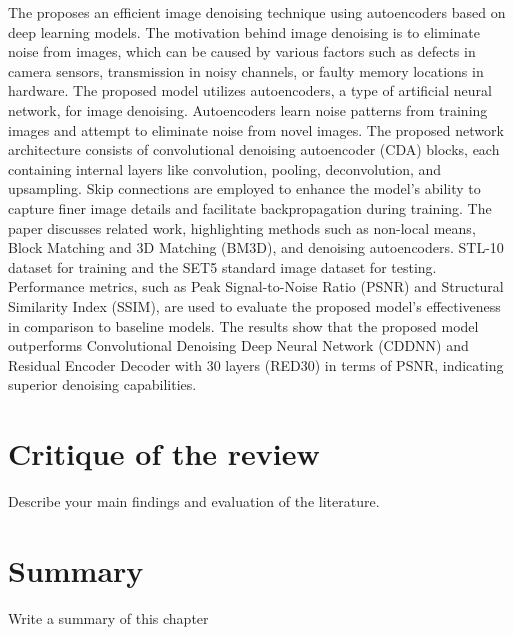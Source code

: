 The \citep{bajaj2020autoencoders} proposes an efficient image denoising technique using autoencoders based on deep learning models. The motivation behind image denoising is to eliminate noise from images, which can be caused by various factors such as defects in camera sensors, transmission in noisy channels, or faulty memory locations in hardware. The proposed model utilizes autoencoders, a type of artificial neural network, for image denoising. Autoencoders learn noise patterns from training images and attempt to eliminate noise from novel images. The proposed network architecture consists of convolutional denoising autoencoder (CDA) blocks, each containing internal layers like convolution, pooling, deconvolution, and upsampling. Skip connections are employed to enhance the model's ability to capture finer image details and facilitate backpropagation during training. The paper discusses related work, highlighting methods such as non-local means, Block Matching and 3D Matching (BM3D), and denoising autoencoders. STL-10 dataset for training and the SET5 standard image dataset for testing. Performance metrics, such as Peak Signal-to-Noise Ratio (PSNR) and Structural Similarity Index (SSIM), are used to evaluate the proposed model's effectiveness in comparison to baseline models. The results show that the proposed model outperforms Convolutional Denoising Deep Neural Network (CDDNN) and Residual Encoder Decoder with 30 layers (RED30) in terms of PSNR, indicating superior denoising capabilities.


\section{Critique of the review} %
Describe your main findings and evaluation of the literature. ~\\

\section{Summary} 
Write a summary of this chapter~\\
